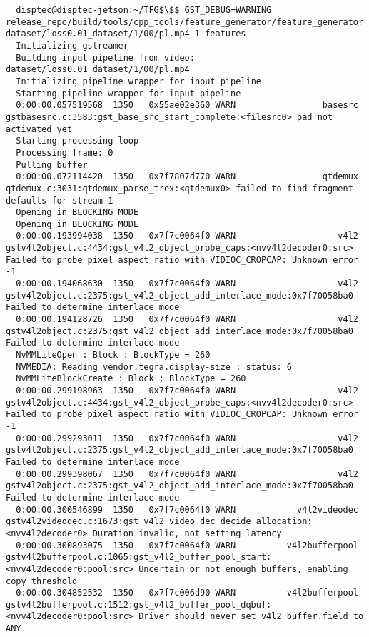 \documentclass[12pt,oneside]{book}
\begin{document}
\begin{lstlisting}
  disptec@disptec-jetson:~/TFG$\$$ GST_DEBUG=WARNING release_repo/build/tools/cpp_tools/feature_generator/feature_generator dataset/loss0.01_dataset/1/00/pl.mp4 1 features
  Initializing gstreamer
  Building input pipeline from video: dataset/loss0.01_dataset/1/00/pl.mp4
  Initializing pipeline wrapper for input pipeline
  Starting pipeline wrapper for input pipeline
  0:00:00.057519568  1350   0x55ae02e360 WARN                 basesrc gstbasesrc.c:3583:gst_base_src_start_complete:<filesrc0> pad not activated yet
  Starting processing loop
  Processing frame: 0
  Pulling buffer
  0:00:00.072114420  1350   0x7f7807d770 WARN                 qtdemux qtdemux.c:3031:qtdemux_parse_trex:<qtdemux0> failed to find fragment defaults for stream 1
  Opening in BLOCKING MODE
  Opening in BLOCKING MODE 
  0:00:00.193994038  1350   0x7f7c0064f0 WARN                    v4l2 gstv4l2object.c:4434:gst_v4l2_object_probe_caps:<nvv4l2decoder0:src> Failed to probe pixel aspect ratio with VIDIOC_CROPCAP: Unknown error -1
  0:00:00.194068630  1350   0x7f7c0064f0 WARN                    v4l2 gstv4l2object.c:2375:gst_v4l2_object_add_interlace_mode:0x7f70058ba0 Failed to determine interlace mode
  0:00:00.194128726  1350   0x7f7c0064f0 WARN                    v4l2 gstv4l2object.c:2375:gst_v4l2_object_add_interlace_mode:0x7f70058ba0 Failed to determine interlace mode
  NvMMLiteOpen : Block : BlockType = 260 
  NVMEDIA: Reading vendor.tegra.display-size : status: 6 
  NvMMLiteBlockCreate : Block : BlockType = 260 
  0:00:00.299198963  1350   0x7f7c0064f0 WARN                    v4l2 gstv4l2object.c:4434:gst_v4l2_object_probe_caps:<nvv4l2decoder0:src> Failed to probe pixel aspect ratio with VIDIOC_CROPCAP: Unknown error -1
  0:00:00.299293011  1350   0x7f7c0064f0 WARN                    v4l2 gstv4l2object.c:2375:gst_v4l2_object_add_interlace_mode:0x7f70058ba0 Failed to determine interlace mode
  0:00:00.299398067  1350   0x7f7c0064f0 WARN                    v4l2 gstv4l2object.c:2375:gst_v4l2_object_add_interlace_mode:0x7f70058ba0 Failed to determine interlace mode
  0:00:00.300546899  1350   0x7f7c0064f0 WARN            v4l2videodec gstv4l2videodec.c:1673:gst_v4l2_video_dec_decide_allocation:<nvv4l2decoder0> Duration invalid, not setting latency
  0:00:00.300893075  1350   0x7f7c0064f0 WARN          v4l2bufferpool gstv4l2bufferpool.c:1065:gst_v4l2_buffer_pool_start:<nvv4l2decoder0:pool:src> Uncertain or not enough buffers, enabling copy threshold
  0:00:00.304852532  1350   0x7f7c006d90 WARN          v4l2bufferpool gstv4l2bufferpool.c:1512:gst_v4l2_buffer_pool_dqbuf:<nvv4l2decoder0:pool:src> Driver should never set v4l2_buffer.field to ANY

\end{lstlisting}
\end{document}
